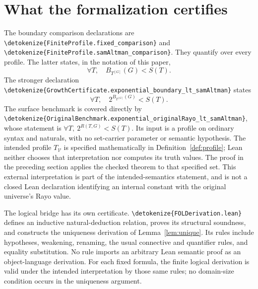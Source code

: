 \documentclass[11pt]{article}
\newcommand{\V}{\mathcal V}
\newcommand{\code}[1]{{\small\expandafter\nolinkurl\expandafter{\detokenize{#1}}}}
\begin{document}
\section{What the formalization certifies}\label{sec:formal}

The boundary comparison declarations are
\code{FiniteProfile.fixed_comparison} and
\code{FiniteProfile.samAltman_comparison}. They quantify over every profile.
The latter states, in the notation of this paper,
\[
                  \forall T,\quad B_{T^{[G]}}(G)<S(T).
\]
The stronger declaration
\code{GrowthCertificate.exponential_boundary_lt_samAltman} states
\[
                  \forall T,\quad 2^{B_{T^{[G]}}(G)}<S(T).
\]
The surface benchmark is covered directly by
\code{OriginalBenchmark.exponential_originalRayo_lt_samAltman}, whose
statement is $\forall T,\ 2^{R(T,G)}<S(T)$. Its input is a profile on
ordinary syntax and naturals, with no set-carrier parameter or semantic
hypothesis.
The intended profile $T_{\V}$ is specified mathematically in
Definition~\ref{def:profile}; Lean neither chooses that interpretation nor
computes its truth values. The proof in the preceding section applies the
checked theorem to that specified set. This external interpretation is part
of the intended-semantics statement, and is not a closed Lean declaration
identifying an internal constant with the original universe's Rayo value.

The logical bridge has its own certificate. \code{FOLDerivation.lean} defines
an inductive natural-deduction relation, proves its structural soundness, and
constructs the uniqueness derivation of Lemma~\ref{lem:unique}. Its rules
include hypotheses, weakening, renaming, the usual connective and quantifier
rules, and equality substitution. No rule imports an arbitrary Lean semantic
proof as an object-language derivation. For each fixed formula, the finite
logical derivation is valid under the intended interpretation by those same
rules; no domain-size condition occurs in the uniqueness argument.
\end{document}
